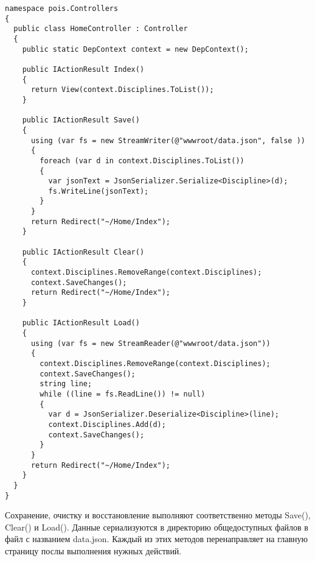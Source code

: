 \begin{verbatim}
namespace pois.Controllers
{
  public class HomeController : Controller
  {
    public static DepContext context = new DepContext();

    public IActionResult Index()
    {
      return View(context.Disciplines.ToList());
    }

    public IActionResult Save()
    {
      using (var fs = new StreamWriter(@"wwwroot/data.json", false ))
      {
        foreach (var d in context.Disciplines.ToList())
        {
          var jsonText = JsonSerializer.Serialize<Discipline>(d);
          fs.WriteLine(jsonText);
        }
      }
      return Redirect("~/Home/Index");
    }

    public IActionResult Clear()
    {
      context.Disciplines.RemoveRange(context.Disciplines);
      context.SaveChanges();
      return Redirect("~/Home/Index");
    }

    public IActionResult Load()
    {
      using (var fs = new StreamReader(@"wwwroot/data.json"))
      {
        context.Disciplines.RemoveRange(context.Disciplines);
        context.SaveChanges();
        string line;
        while ((line = fs.ReadLine()) != null)
        {
          var d = JsonSerializer.Deserialize<Discipline>(line);
          context.Disciplines.Add(d);
          context.SaveChanges();
        }
      }
      return Redirect("~/Home/Index");
    }
  }
}
\end{verbatim}

Сохранение, очистку и восстановление выполняют соответственно методы Save(), Clear() и Load(). Данные сериализуются в директорию общедоступных файлов в файл с названием data.json. Каждый из этих методов перенаправляет на главную страницу послы выполнения нужных действий.